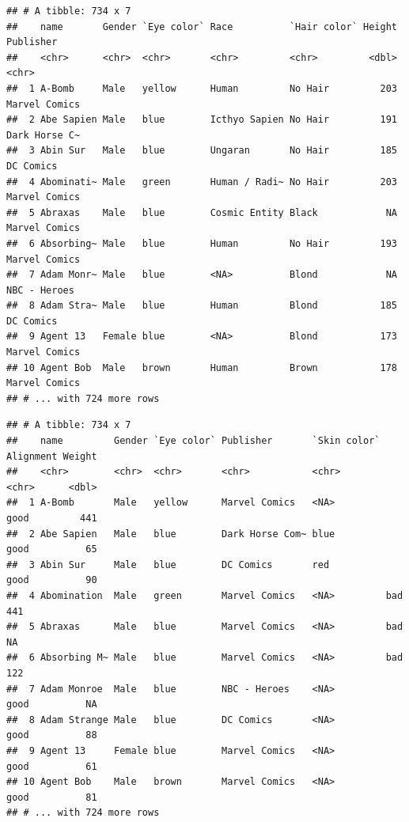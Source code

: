 \documentclass[]{book}
\newenvironment{Shaded}{\begin{snugshade}}{\end{snugshade}}
\newcommand{\KeywordTok}[1]{\textcolor[rgb]{0.13,0.29,0.53}{\textbf{#1}}}
\newcommand{\DataTypeTok}[1]{\textcolor[rgb]{0.13,0.29,0.53}{#1}}
\newcommand{\StringTok}[1]{\textcolor[rgb]{0.31,0.60,0.02}{#1}}
\newcommand{\OperatorTok}[1]{\textcolor[rgb]{0.81,0.36,0.00}{\textbf{#1}}}
\newcommand{\NormalTok}[1]{#1}
\begin{document}
\begin{Shaded}
\end{Shaded}

\begin{verbatim}
## # A tibble: 734 x 7
##    name       Gender `Eye color` Race          `Hair color` Height Publisher    
##    <chr>      <chr>  <chr>       <chr>         <chr>         <dbl> <chr>        
##  1 A-Bomb     Male   yellow      Human         No Hair         203 Marvel Comics
##  2 Abe Sapien Male   blue        Icthyo Sapien No Hair         191 Dark Horse C~
##  3 Abin Sur   Male   blue        Ungaran       No Hair         185 DC Comics    
##  4 Abominati~ Male   green       Human / Radi~ No Hair         203 Marvel Comics
##  5 Abraxas    Male   blue        Cosmic Entity Black            NA Marvel Comics
##  6 Absorbing~ Male   blue        Human         No Hair         193 Marvel Comics
##  7 Adam Monr~ Male   blue        <NA>          Blond            NA NBC - Heroes 
##  8 Adam Stra~ Male   blue        Human         Blond           185 DC Comics    
##  9 Agent 13   Female blue        <NA>          Blond           173 Marvel Comics
## 10 Agent Bob  Male   brown       Human         Brown           178 Marvel Comics
## # ... with 724 more rows
\end{verbatim}

\begin{Shaded}
\end{Shaded}

\begin{verbatim}
## # A tibble: 734 x 7
##    name         Gender `Eye color` Publisher       `Skin color` Alignment Weight
##    <chr>        <chr>  <chr>       <chr>           <chr>        <chr>      <dbl>
##  1 A-Bomb       Male   yellow      Marvel Comics   <NA>         good         441
##  2 Abe Sapien   Male   blue        Dark Horse Com~ blue         good          65
##  3 Abin Sur     Male   blue        DC Comics       red          good          90
##  4 Abomination  Male   green       Marvel Comics   <NA>         bad          441
##  5 Abraxas      Male   blue        Marvel Comics   <NA>         bad           NA
##  6 Absorbing M~ Male   blue        Marvel Comics   <NA>         bad          122
##  7 Adam Monroe  Male   blue        NBC - Heroes    <NA>         good          NA
##  8 Adam Strange Male   blue        DC Comics       <NA>         good          88
##  9 Agent 13     Female blue        Marvel Comics   <NA>         good          61
## 10 Agent Bob    Male   brown       Marvel Comics   <NA>         good          81
## # ... with 724 more rows
\end{verbatim}
\end{document}
